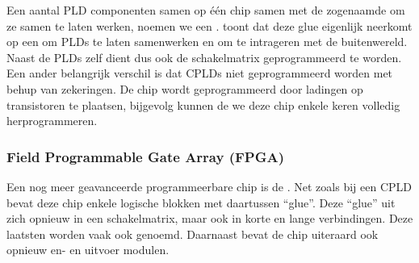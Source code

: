 Een aantal PLD componenten samen op \'e\'en chip samen met de zogenaamde  om ze samen te laten werken, noemen we een .  toont dat deze glue eigenlijk neerkomt op een  om PLDs te laten samenwerken en  om te intrageren met de buitenwereld. Naast de PLDs zelf dient dus ook de schakelmatrix geprogrammeerd te worden. Een ander belangrijk verschil is dat CPLDs niet geprogrammeerd worden met behup van zekeringen. De chip wordt geprogrammeerd door ladingen op transistoren te plaatsen, bijgevolg kunnen de we deze chip enkele keren volledig herprogrammeren.
\subsubsection{Field Programmable Gate Array (FPGA)}
Een nog meer geavanceerde programmeerbare chip is de . Net zoals bij een CPLD bevat deze chip enkele logische blokken met daartussen ``glue''. Deze ``glue'' uit zich opnieuw in een schakelmatrix, maar ook in korte en lange verbindingen. Deze laatsten worden vaak ook  genoemd. Daarnaast bevat de chip uiteraard ook opnieuw en- en uitvoer modulen. 
